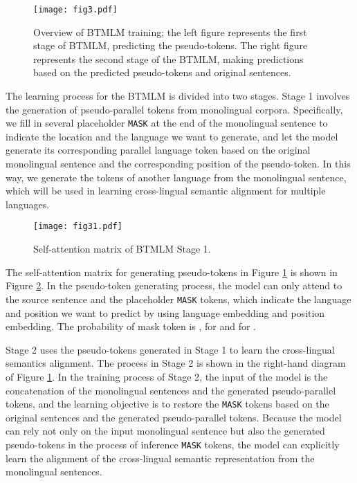 \documentclass[11pt]{article}
\begin{document}
\begin{figure}[!ht]
    \centering
    \texttt{[image: fig3.pdf]}
    \vspace{-0.1in}
    \caption{Overview of BTMLM training; the left figure represents the first stage of BTMLM, predicting the pseudo-tokens. The right figure represents the second stage of the BTMLM, making predictions based on the predicted pseudo-tokens and original sentences.}
    \label{fig3}
    \vspace{-0in}
\end{figure}

The learning process for the BTMLM is divided into two stages. Stage 1 involves the generation of pseudo-parallel tokens from monolingual corpora. Specifically, we fill in several placeholder \texttt{MASK} at the end of the monolingual sentence to indicate the location and the language we want to generate, and let the model generate its corresponding parallel language token based on the original monolingual sentence and the corresponding position of the pseudo-token. In this way, we generate the tokens of another language from the monolingual sentence, which will be used in learning cross-lingual semantic alignment for multiple languages.

\begin{figure}[htp]
\vskip 0.1in
\centering
\texttt{[image: fig31.pdf]}
\caption{Self-attention matrix of BTMLM Stage 1.}
\label{fig4}
\vskip -0in
\end{figure}

The self-attention matrix for generating pseudo-tokens in Figure \ref{fig3} is shown in Figure \ref{fig4}. In the pseudo-token generating process, the model can only attend to the source sentence and the placeholder \texttt{MASK} tokens, which indicate the language and position we want to predict by using language embedding and position embedding. The probability of mask token  is ,  for  and   for .

Stage 2 uses the pseudo-tokens generated in Stage 1 to learn the cross-lingual semantics alignment. The process in Stage 2 is shown in the right-hand diagram of Figure \ref{fig3}. In the training process of Stage 2, the input of the model is the concatenation of the monolingual sentences and the generated pseudo-parallel tokens, and the learning objective is to restore the \texttt{MASK} tokens based on the original sentences and the generated pseudo-parallel tokens. Because the model can rely not only on the input monolingual sentence but also the generated pseudo-tokens in the process of inference \texttt{MASK} tokens, the model can explicitly learn the alignment of the cross-lingual semantic representation from the monolingual sentences.
\end{document}

